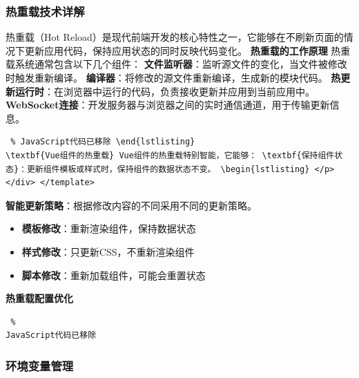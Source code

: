 \subsubsection{热重载技术详解}\label{ux70edux91cdux8f7dux6280ux672fux8be6ux89e3} 热重载（Hot
Reload）是现代前端开发的核心特性之一，它能够在不刷新页面的情况下更新应用代码，保持应用状态的同时反映代码变化。 \textbf{热重载的工作原理} 热重载系统通常包含以下几个组件：
\textbf{文件监听器}：监听源文件的变化，当文件被修改时触发重新编译。 \textbf{编译器}：将修改的源文件重新编译，生成新的模块代码。 \textbf{热更新运行时}：在浏览器中运行的代码，负责接收更新并应用到当前应用中。
\textbf{WebSocket连接}：开发服务器与浏览器之间的实时通信通道，用于传输更新信息。 \begin{lstlisting} % JavaScript代码已移除 \end{lstlisting}
\textbf{Vue组件的热重载} Vue组件的热重载特别智能，它能够： \textbf{保持组件状态}：更新组件模板或样式时，保持组件的数据状态不变。 \begin{lstlisting} </p> </div> </template>
\end{lstlisting} \textbf{智能更新策略}：根据修改内容的不同采用不同的更新策略。 \begin{itemize} \tightlist \item \textbf{模板修改}：重新渲染组件，保持数据状态 \item
\textbf{样式修改}：只更新CSS，不重新渲染组件 \item \textbf{脚本修改}：重新加载组件，可能会重置状态 \end{itemize} \textbf{热重载配置优化} \begin{lstlisting} %
JavaScript代码已移除 \end{lstlisting} \subsubsection{环境变量管理}\label{ux73afux5883ux53d8ux91cfux7ba1ux7406}

